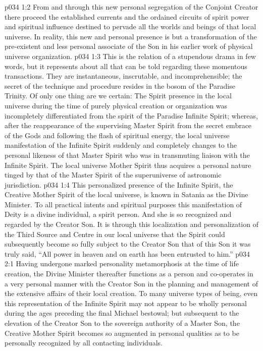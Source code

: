 \vs p034 1:2 From and through this new personal segregation of the Conjoint Creator there proceed the established currents and the ordained circuits of spirit power and spiritual influence destined to pervade all the worlds and beings of that local universe. In reality, this new and personal presence is but a transformation of the pre\hyp{}existent and less personal associate of the Son in his earlier work of physical universe organization.
\vs p034 1:3 \pc This is the relation of a stupendous drama in few words, but it represents about all that can be told regarding these momentous transactions. They are instantaneous, inscrutable, and incomprehensible; the secret of the technique and procedure resides in the bosom of the Paradise Trinity. Of only one thing are we certain: The Spirit presence in the local universe during the time of purely physical creation or organization was incompletely differentiated from the spirit of the Paradise Infinite Spirit; whereas, after the reappearance of the supervising Master Spirit from the secret embrace of the Gods and following the flash of spiritual energy, the local universe manifestation of the Infinite Spirit suddenly and completely changes to the personal likeness of that Master Spirit who was in transmuting liaison with the Infinite Spirit. The local universe Mother Spirit thus acquires a personal nature tinged by that of the Master Spirit of the superuniverse of astronomic jurisdiction.
\vs p034 1:4 This personalized presence of the Infinite Spirit, the Creative Mother Spirit of the local universe, is known in Satania as the Divine Minister. To all practical intents and spiritual purposes this manifestation of Deity is a divine individual, a spirit person. And she is so recognized and regarded by the Creator Son. It is through this localization and personalization of the Third Source and Centre in our local universe that the Spirit could subsequently become so fully subject to the Creator Son that of this Son it was truly said, “All power in heaven and on earth has been entrusted to him.”
\vs p034 2:1 Having undergone marked personality metamorphosis at the time of life creation, the Divine Minister thereafter functions as a person and co\hyp{}operates in a very personal manner with the Creator Son in the planning and management of the extensive affairs of their local creation. To many universe types of being, even this representation of the Infinite Spirit may not appear to be wholly personal during the ages preceding the final Michael bestowal; but subsequent to the elevation of the Creator Son to the sovereign authority of a Master Son, the Creative Mother Spirit becomes so augmented in personal qualities as to be personally recognized by all contacting individuals.
